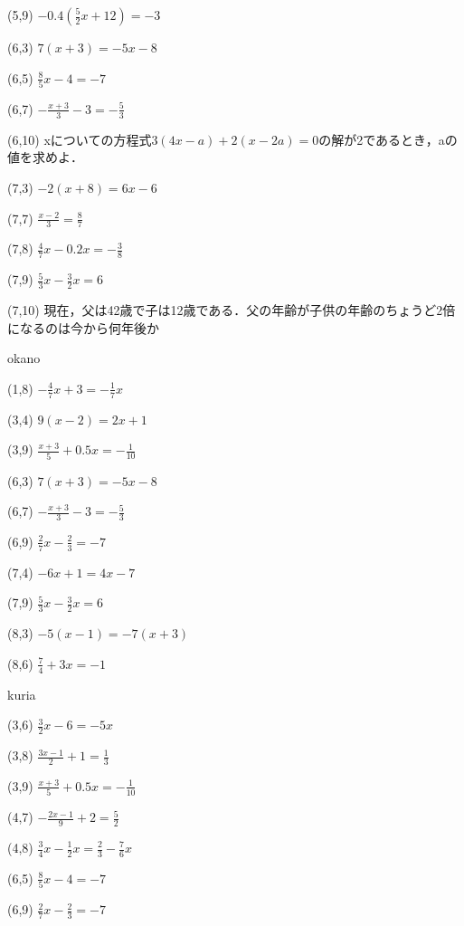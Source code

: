 \documentclass[a4paper,fleqn,papersize,15pt]{jsarticle}
\begin{document}
(5,9)  \large     $-0.4( \frac{5}{2}x+12 ) = -3$

(6,3)  \large     $7(x + 3) = -5x -8$

(6,5)  \large     $\frac{8}{5}x -4 = -7$

(6,7)  \large     $- \frac{x+3}{3} -3 = - \frac{5}{3}$

(6,10)  \large     xについての方程式$3(4x-a)+2(x-2a)=0$の解が2であるとき，aの値を求めよ．

(7,3)  \large     $-2(x + 8) = 6x - 6$

(7,7)  \large     $\frac{x-2}{3}  = \frac{8}{7}$

(7,8)  \large     $\frac{4}{7}x -0.2x = - \frac{3}{8}$

(7,9)  \large     $\frac{5}{3}x - \frac{3}{2}x = 6$

(7,10)  \large     現在，父は42歳で子は12歳である．父の年齢が子供の年齢のちょうど2倍になるのは今から何年後か

\clearpage
okano   

 (1,8)  \large     $- \frac{4}{7}x + 3 = - \frac{1}{7}x$

(3,4)  \large     $9(x -2) = 2x + 1$

(3,9)  \large     $\frac{x+3}{5} +0.5x = -\frac{1}{10}$

(6,3)  \large     $7(x + 3) = -5x -8$

(6,7)  \large     $- \frac{x+3}{3} -3 = - \frac{5}{3}$

(6,9)  \large     $\frac{2}{7}x - \frac{2}{3} = -7$

(7,4)  \large     $-6x + 1 = 4x -7$

(7,9)  \large     $\frac{5}{3}x - \frac{3}{2}x = 6$

(8,3)  \large     $-5(x -1) = -7(x + 3)$

(8,6)  \large     $\frac{7}{4} + 3x = -1$

\clearpage
kuria   

 (3,6)  \large     $\frac{3}{2}x -6 = -5x$

(3,8)  \large     $\frac{3x-1}{2} + 1 = \frac{1}{3}$

(3,9)  \large     $\frac{x+3}{5} +0.5x = -\frac{1}{10}$

(4,7)  \large     $- \frac{2x-1}{9} + 2 = \frac{5}{2}$

(4,8)  \large     $\frac{3}{4}x-\frac{1}{2}x = \frac{2}{3}-\frac{7}{6}x$

(6,5)  \large     $\frac{8}{5}x -4 = -7$

(6,9)  \large     $\frac{2}{7}x - \frac{2}{3} = -7$
\end{document}
